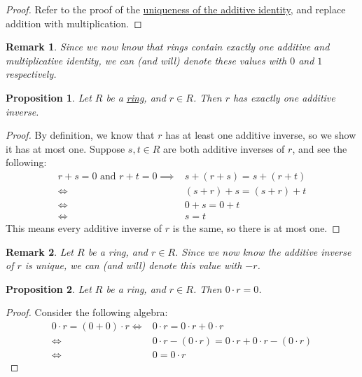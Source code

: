 \documentclass{scrartcl}
\theoremstyle{definition}
\theoremstyle{plain}
\newtheorem{proposition}{Proposition}[section]
\newtheorem{remark}{Remark}[section]
\begin{document}
\begin{proof}
    Refer to the proof of the \hyperref[prop:unique additive identity]{uniqueness of the additive identity}, and
    replace addition with multiplication.
\end{proof}

\begin{remark}
    Since we now know that rings contain exactly one additive and multiplicative identity, we can (and will) denote
    these values with $0$ and $1$ respectively.
\end{remark}

\begin{proposition}
    \label{prop:unique additive inverse}
    Let $R$ be a \hyperref[def:ring]{ring}, and $r\in R$.
    Then $r$ has exactly one additive inverse.
\end{proposition}

\begin{proof}
    By definition, we know that $r$ has at least one additive inverse, so we show it has at most one.
    Suppose $s,t\in R$ are both additive inverses of $r$, and see the following:
    \begin{align}
        r+s=0\text{ and }r+t=0
        \implies& s+(r+s)=s+(r+t) \\
        \iff& (s+r)+s=(s+r)+t \\
        \iff& 0+s=0+t \\
        \iff& s=t
    \end{align}
    This means every additive inverse of $r$ is the same, so there is at most one.
\end{proof}

\begin{remark}
    Let $R$ be a ring, and $r\in R$.
    Since we now know the additive inverse of $r$ is unique, we can (and will) denote this value with $-r$.
\end{remark}

\begin{proposition}
    Let $R$ be a ring, and $r\in R$.
    Then $0\cdot r=0$.
\end{proposition}

\begin{proof}
    Consider the following algebra:
    \begin{align}
        0\cdot r=(0+0)\cdot r
        \iff& 0\cdot r=0\cdot r+0\cdot r \\
        \iff& 0\cdot r-(0\cdot r)=0\cdot r+0\cdot r-(0\cdot r) \\
        \iff& 0=0\cdot r
    \end{align}
\end{proof}
\end{document}
